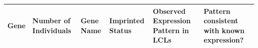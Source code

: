 \begin{table}
\centering
\begin{adjustbox}{width={\textwidth}}
\begin{tabular}{@{}p{4cm}p{3cm}p{3cm}p{3cm}p{3cm}p{3cm}@{}}
\toprule Gene & 	Number of \newline Individuals & 	Gene Name&	Imprinted \newline Status	&Observed \newline Expression \newline Pattern \newline in LCLs	&Pattern \newline consistent with \newline known \newline expression? \\ \midrule


\end{tabular}
\end{adjustbox}
\end{table}
